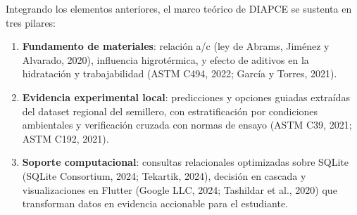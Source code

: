 Integrando los elementos anteriores, el marco teórico de DIAPCE se sustenta en tres pilares:

\begin{enumerate}
  \item \textbf{Fundamento de materiales}: relación a/c (ley de Abrams, Jiménez y Alvarado, 2020), influencia higrotérmica, y efecto de aditivos en la hidratación y trabajabilidad (ASTM C494, 2022; García y Torres, 2021).
  \item \textbf{Evidencia experimental local}: predicciones y opciones guiadas extraídas del dataset regional del semillero, con estratificación por condiciones ambientales y verificación cruzada con normas de ensayo (ASTM C39, 2021; ASTM C192, 2021).
  \item \textbf{Soporte computacional}: consultas relacionales optimizadas sobre SQLite (SQLite Consortium, 2024; Tekartik, 2024), decisión en cascada y visualizaciones en Flutter (Google LLC, 2024; Tashildar et al., 2020) que transforman datos en evidencia accionable para el estudiante.
\end{enumerate}
